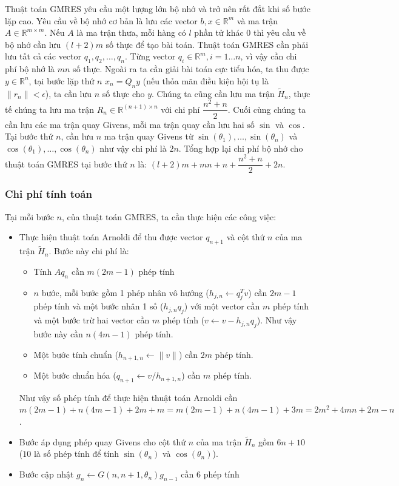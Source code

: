 \documentclass[14pt, a4paper]{article}
\numberwithin{equation}{section}
\numberwithin{algorithm}{section}
\numberwithin{figure}{section}
\numberwithin{dl}{section}
\numberwithin{md}{section}
\numberwithin{bd}{section}
\numberwithin{dn}{section}
\begin{document}
Thuật toán GMRES yêu cầu một lượng lớn bộ nhớ và trở nên rất đắt khi số bước lặp cao.
Yêu cầu về bộ nhớ cơ bản là lưu các vector $b, x \in \mathbb{R}^{m}$ và ma trận $A \in \mathbb{R}^{m \times m}$. Nếu $A$ là ma trận thưa, mỗi hàng có $l$ phần tử khác 0 thì yêu cầu về bộ nhớ cần lưu $(l+2)m$ số thực để tạo bài toán. Thuật toán GMRES cần phải lưu tất cả các vector $q_1, q_2, \dots, q_n$. Từng vector $q_i \in \mathbb{R}^{m}, i=1\dots n$, vì vậy cần chi phí bộ nhớ là $mn$ số thực.
Ngoài ra ta cần giải bài toán cực tiểu hóa, ta thu được $y \in \mathbb{R}^n$, tại bước lặp thứ $n$ $x_n = Q_n y$ (nếu thỏa mãn điều kiện hội tụ là $\lVert r_n \rVert < \epsilon$), ta cần lưu $n$ số thực cho $y$.
Chúng ta cũng cần lưu ma trận $\widetilde{H}_n$, thực tế chúng ta lưu ma trận $R_n \in \mathbb{R}^{(n+1) \times n}$ với chi phí $\dfrac{n^2 + n}{2}$.
Cuối cùng chúng ta cần lưu các ma trận quay Givens, mỗi ma trận quay cần lưu hai số $\sin$ và $\cos$. Tại bước thứ $n$, cần lưu $n$ ma trận quay Givens từ $\sin(\theta_1),\dots, \sin(\theta_n)$ và $\cos(\theta_1),\dots,\cos(\theta_n)$ như vậy chi phí là $2n$.
Tổng hợp lại chi phí bộ nhớ cho thuật toán GMRES tại bước thứ $n$ là: $(l+2)m + mn + n + \dfrac{n^2 + n}{2} + 2n$.

\subsubsection{Chi phí tính toán}

Tại mỗi bước $n$, của thuật toán GMRES, ta cần thực hiện các công việc:

\begin{itemize}
    \item Thực hiện thuật toán Arnoldi để thu được vector $q_{n+1}$ và cột thứ $n$ của ma trận $\widetilde{H}_n$. Bước này chi phí là: \begin{itemize}
        \item Tính $Aq_n$ cần $m(2m-1)$ phép tính
        \item $n$ bước, mỗi bước gồm 1 phép nhân vô hướng ($h_{j,n} \leftarrow q_j^Tv$) cần $2m-1$ phép tính và một bước nhân 1 số ($h_{j,n}q_j$) với một vector cần $m$ phép tính và một bước trừ hai vector cần $m$ phép tính ($v \leftarrow v - h_{j,n}q_j$). Như vậy bước này cần $n(4m-1)$ phép tính.
        \item Một bước tính chuẩn ($h_{n+1,n} \leftarrow \lVert v \rVert$) cần $2m$ phép tính.
        \item Một bước chuẩn hóa ($q_{n+1} \leftarrow v/h_{n+1,n}$) cần $m$ phép tính.
    \end{itemize}
    Như vậy số phép tính để thực hiện thuật toán Arnoldi cần $m(2m-1) + n(4m-1) + 2m + m=m(2m-1) + n(4m-1)+ 3m=2m^2+4mn+2m-n$.
    \item Bước áp dụng phép quay Givens cho cột thứ $n$ của ma trận $\widetilde{H}_n$ gồm $6n+10$ ($10$ là số phép tính để tính $\sin(\theta_n)$ và $\cos(\theta_n)$).
    \item Bước cập nhật $g_n \leftarrow G(n, n+1, \theta_n)g_{n-1}$ cần 6 phép tính
\end{itemize}
\end{document}
